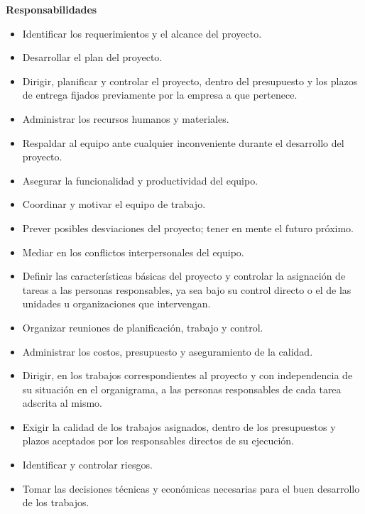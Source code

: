         
\textbf{        Responsabilidades}
            \begin{itemize}
                \item Identificar los requerimientos y el alcance del proyecto.
                \item Desarrollar el plan del proyecto.
                \item Dirigir, planificar y controlar el proyecto, dentro del presupuesto y los plazos de entrega fijados previamente por la empresa a que pertenece.
				\item Administrar los recursos humanos y materiales.
                \item Respaldar al equipo ante cualquier inconveniente durante el desarrollo del proyecto.
                \item Asegurar la funcionalidad y productividad del equipo.
                \item Coordinar y motivar el equipo de trabajo.
                \item Prever posibles desviaciones del proyecto; tener en mente el futuro próximo.
                \item Mediar en los conflictos interpersonales del equipo.
                \item Definir las características básicas del proyecto y controlar la asignación de tareas a las personas responsables, ya sea bajo su control directo o el de las unidades u organizaciones que intervengan.
                \item Organizar reuniones de planificación, trabajo y control.
                \item Administrar los costos, presupuesto y aseguramiento de la calidad.
                \item Dirigir, en los trabajos correspondientes al proyecto y con independencia de su situación en el organigrama, a las personas responsables de cada tarea adscrita al mismo.
                \item Exigir la calidad de los trabajos asignados, dentro de los presupuestos y plazos aceptados por los responsables directos de su ejecución.
                \item Identificar y controlar riesgos.
                \item Tomar las decisiones técnicas y económicas necesarias para el buen desarrollo de los trabajos.
			\end{itemize}
             
